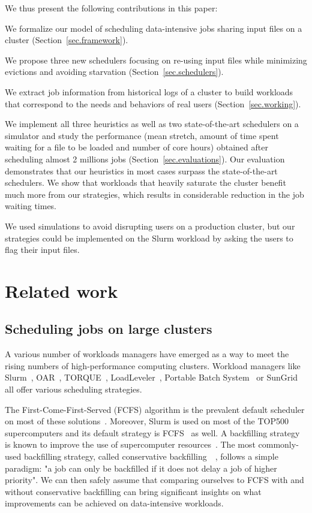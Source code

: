 \documentclass[conference]{IEEEtran}
\begin{document}
We thus present the following contributions in this paper:
\begin{compactenum}
	\item We formalize our model of scheduling data-intensive jobs sharing input files on a cluster (Section~\ref{sec.framework}).
	\item We propose three new schedulers focusing on re-using input files while minimizing evictions and avoiding starvation (Section~\ref{sec.schedulers}).
	\item We extract job information from historical logs of a cluster to build workloads that correspond to the needs and behaviors of real users (Section~\ref{sec.working}).
	\item We implement all three heuristics as well as two state-of-the-art schedulers on a simulator and study the performance (mean stretch, amount of time spent waiting for a file to be loaded and number of core hours) obtained after scheduling almost 2 millions jobs (Section~\ref{sec.evaluations}).
	Our evaluation demonstrates that our heuristics in most cases surpass the state-of-the-art schedulers.
	We show that workloads that heavily saturate the cluster
    benefit much more from our strategies, which results in
    considerable reduction in the job waiting times.
\end{compactenum}
We used simulations to avoid disrupting users on a production
cluster, but our strategies could be implemented on the Slurm workload
by asking the users to flag their input files.

\section{Related work}\label{sec.related_work}

\subsection{Scheduling jobs on large clusters}

A various number of workloads managers have emerged 
as a way to meet the rising numbers of high-performance computing clusters.
Workload managers like Slurm~\cite{SLURM}, OAR~\cite{oar},
TORQUE~\cite{torque}, LoadLeveler~\cite{loadleveler},
Portable Batch System~\cite{pbs} or SunGrid~\cite{sungrid}
all offer
various scheduling strategies.

The First-Come-First-Served (FCFS) algorithm is the prevalent default
scheduler on most of these solutions~\cite{survey_workload_manager_and_scheduler}.
Moreover, Slurm is used on most of the TOP500 supercomputers and its default strategy is FCFS~\cite{slurm_website_scheduling} as well.
A backfilling strategy is known to improve
the use of supercomputer resources~\cite{maui}. 
The most commonly-used backfilling strategy, called conservative 
backfilling~\cite{Characterization_of_Backfilling}~\cite{Introducing-New-Backfill-based}, follows
a simple paradigm: "a job can only be backfilled if it does not
delay a job of higher priority".
We can then safely assume that comparing ourselves to FCFS with and without conservative backfilling can 
bring significant insights on what improvements can be achieved on data-intensive workloads.
\end{document}
